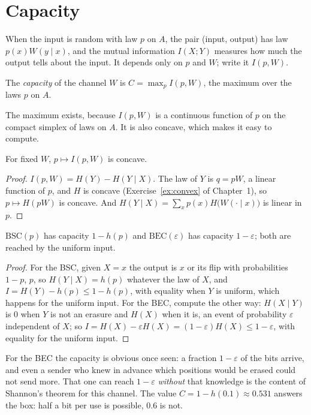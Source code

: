 \section{Capacity}\label{sec:capacity}

When the input is random with law $p$ on $A$, the pair (input, output) has law $p(x)W(y\mid x)$, and the mutual information $I(X;Y)$ measures how much the output tells about the input. It depends only on $p$ and $W$; write it $I(p,W)$.

\begin{definition}\label{def:capacity}
The \emph{capacity} of the channel $W$ is $C=\max_pI(p,W)$, the maximum over the laws $p$ on $A$.
\end{definition}

The maximum exists, because $I(p,W)$ is a continuous function of $p$ on the compact simplex of laws on $A$. It is also concave, which makes it easy to compute.

\begin{proposition}\label{prop:concave}
For fixed $W$, $p\mapsto I(p,W)$ is concave.
\end{proposition}

\begin{proof}
$I(p,W)=H(Y)-H(Y\mid X)$. The law of $Y$ is $q=pW$, a linear function of $p$, and $H$ is concave (Exercise~\ref{ex:convex} of Chapter~1), so $p\mapsto H(pW)$ is concave. And $H(Y\mid X)=\sum_xp(x)H\bigl(W(\cdot\mid x)\bigr)$ is linear in $p$.
\end{proof}

\begin{proposition}\label{prop:bscbec}
$\mathrm{BSC}(p)$ has capacity $1-h(p)$ and $\mathrm{BEC}(\varepsilon)$ has capacity $1-\varepsilon$; both are reached by the uniform input.
\end{proposition}

\begin{proof}
For the BSC, given $X=x$ the output is $x$ or its flip with probabilities $1-p$, $p$, so $H(Y\mid X)=h(p)$ whatever the law of $X$, and $I=H(Y)-h(p)\le1-h(p)$, with equality when $Y$ is uniform, which happens for the uniform input. For the BEC, compute the other way: $H(X\mid Y)$ is $0$ when $Y$ is not an erasure and $H(X)$ when it is, an event of probability $\varepsilon$ independent of $X$; so $I=H(X)-\varepsilon H(X)=(1-\varepsilon)H(X)\le1-\varepsilon$, with equality for the uniform input.
\end{proof}

For the BEC the capacity is obvious once seen: a fraction $1-\varepsilon$ of the bits arrive, and even a sender who knew in advance which positions would be erased could not send more. That one can reach $1-\varepsilon$ \emph{without} that knowledge is the content of Shannon's theorem for this channel. The value $C=1-h(0.1)\approx0.531$ answers the box: half a bit per use is possible, $0.6$ is not.

